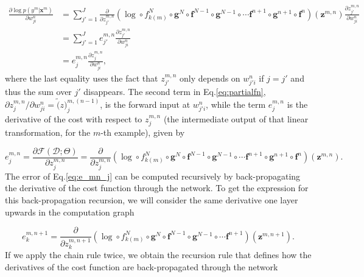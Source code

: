 \begin{align}
\frac{\partial \log p(y^m | \mathbf{x}^m)}{\partial w_{ji}^n} & = \sum_{j'=1}^J \frac{\partial}{\partial z^{m,n}_{j'}} (\log \circ f_{k(m)}^N \circ \mathbf{g}^N \circ \mathbf{f}^{N-1} \circ \mathbf{g}^{N-1} \circ \cdots \mathbf{f}^{n+1} \circ \mathbf{g}^{n+1} \circ \mathbf{f}^{n})(\mathbf{z}^{m,n})\frac{\partial z^{m,n}_{j'}}{\partial w_{ji}^n}\nonumber\\ & = \sum_{j'=1}^J e^{m,n}_{j'} \frac{\partial z^{m,n}_{j'}}{\partial w_{ji}^n}\nonumber\\ & = e^{m,n}_{j}\frac{\partial z^{m,n}_{j}}{\partial w_{ji}^n},
\label{eq:partialfn}
\end{align}
%
where the last equality uses the fact that $z^{m,n}_{j'}$ only depends on
$w_{j'i}^n$ if $j=j'$ and thus the sum over $j'$ disappears. The second term in Eq.\ref{eq:partialfn}, ${\partial z^{m,n}_{j}}/{\partial w_{ji}^n}=\tilde(z)_{j}^{m,(n-1)}$, is the forward input at $w_{j'i}^n$, while the term $e^{m,n}_j$
is the derivative of the cost with respect to ${z}^{m,n}_j$ (the intermediate output of that linear transformation, for the $m$-th example),  given by

\begin{equation}
e^{m,n}_j =  \frac{\partial \mathcal{F}(\mathcal{D};\Theta)}{\partial z^{m,n}_{j}} = \frac{\partial}{\partial z^{m,n}_{j}} (\log \circ f_{k(m)}^N \circ \mathbf{g}^N \circ \mathbf{f}^{N-1} \circ \mathbf{g}^{N-1} \circ \cdots \mathbf{f}^{n+1} \circ \mathbf{g}^{n+1} \circ \mathbf{f}^{n})(\mathbf{z}^{m,n}).
\label{eq:e_mn_j}
\end{equation}
%
The error of Eq.\ref{eq:e_mn_j} can be computed recursively by back-propagating the derivative of the cost function through the network.
To get the expression for this back-propagation recursion, we will consider the same derivative one layer upwards in the
computation graph  

\begin{equation}
e^{m,n+1}_k = \frac{\partial}{\partial z^{m,n+1}_{k}} (\log \circ f_{k(m)}^N \circ \mathbf{g}^N \circ \mathbf{f}^{N-1} \circ \mathbf{g}^{N-1} \circ \cdots \mathbf{f}^{n+1})(\mathbf{z}^{m,n+1}).
\end{equation}
%
%
\noindent If we apply the chain rule twice, we obtain the
recursion rule that defines how the derivatives of the cost function are back-propagated through the network\footnotemark{}


